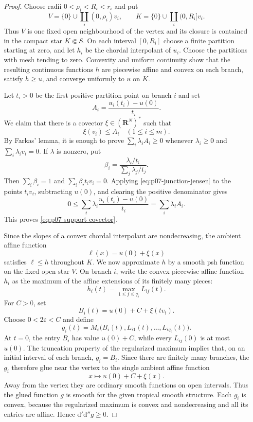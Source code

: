 \begin{proof}
Choose radii $0<\rho_i<R_i<r_i$ and put
\[
 V=\{0\}\cup\coprod_i(0,\rho_i)v_i,
 \qquad
 K=\{0\}\cup\coprod_i(0,R_i]v_i.
\]
Thus $V$ is one fixed open neighbourhood of the vertex and its closure is
contained in the compact star $K\Subset S$.  On each interval $[0,R_i]$
choose a finite partition starting at zero, and let $h_i$ be the chordal
interpolant of $u_i$.  Choose the partitions with mesh tending to zero.
Convexity and uniform continuity show that the resulting continuous
functions $h$ are piecewise affine and convex on each branch, satisfy
$h\geq u$, and converge uniformly to $u$ on $K$.

Let $t_i>0$ be the first positive partition point on branch $i$ and set
\[
                   A_i=\frac{u_i(t_i)-u(0)}{t_i}.
\]
We claim that there is a covector $\xi\in(\mathbf R^N)^*$ such that
\begin{equation}
\label{eq:p07-support-covector}
                         \xi(v_i)\leq A_i
                         \quad(1\leq i\leq m).
\end{equation}
By Farkas' lemma, it is enough to prove
$\sum_i\lambda_iA_i\geq0$ whenever $\lambda_i\geq0$ and
$\sum_i\lambda_i v_i=0$.  If $\lambda$ is nonzero, put
\[
 \beta_i=
 \frac{\lambda_i/t_i}{\sum_j\lambda_j/t_j}.
\]
Then $\sum_i\beta_i=1$ and $\sum_i\beta_it_iv_i=0$.  Applying
\eqref{eq:p07-junction-jensen} to the points $t_iv_i$, subtracting $u(0)$,
and clearing the positive denominator gives
\[
                  0\leq\sum_i\lambda_i
                  \frac{u_i(t_i)-u(0)}{t_i}
                  =\sum_i\lambda_iA_i.
\]
This proves \eqref{eq:p07-support-covector}.

Since the slopes of a convex chordal interpolant are nondecreasing, the
ambient affine function
\[
                         \ell(x)=u(0)+\xi(x)
\]
satisfies $\ell\leq h$ throughout $K$.  We now approximate $h$ by a smooth
psh function on the fixed open star $V$.  On branch $i$, write the convex
piecewise-affine function $h_i$ as the maximum of the affine extensions of
its finitely many pieces:
\[
                         h_i(t)=\max_{1\leq j\leq q_i}L_{ij}(t).
\]
For $C>0$, set
\[
                         B_i(t)=u(0)+C+\xi(tv_i).
\]
Choose $0<2\varepsilon<C$ and define
\[
 g_i(t)=M_\varepsilon
       \bigl(B_i(t),L_{i1}(t),\ldots,L_{iq_i}(t)\bigr).
\]
At $t=0$, the entry $B_i$ has value $u(0)+C$, while every $L_{ij}(0)$ is
at most $u(0)$.  The truncation property of the regularized maximum implies
that, on an initial interval of each branch, $g_i=B_i$.  Since there are
finitely many branches, the $g_i$ therefore glue near the vertex to the
single ambient affine function
\[
                         x\longmapsto u(0)+C+\xi(x).
\]
Away from the vertex they are ordinary smooth functions on open intervals.
Thus the glued function $g$ is smooth for the given tropical smooth
structure.  Each $g_i$ is convex, because the regularized maximum is convex
and nondecreasing and all its entries are affine.  Hence
$\mathrm d'\mathrm d''g\geq0$.


\end{proof}
